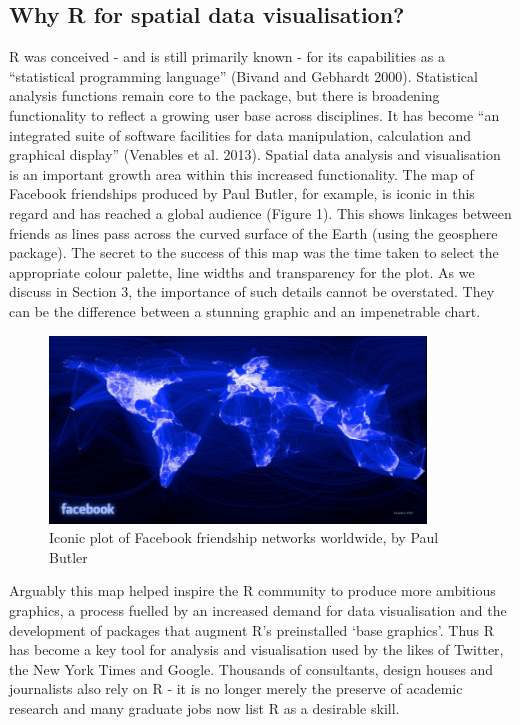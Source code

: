 \documentclass[]{article}
\let\Oldincludegraphics\includegraphics
\renewcommand{\includegraphics}[1]{\Oldincludegraphics[width=10cm]{#1}}
\begin{document}
\subsection{Why R for spatial data visualisation?}

R was conceived - and is still primarily known - for its capabilities as
a ``statistical programming language'' (Bivand and Gebhardt 2000).
Statistical analysis functions remain core to the package, but there is
broadening functionality to reflect a growing user base across
disciplines. It has become ``an integrated suite of software facilities
for data manipulation, calculation and graphical display'' (Venables et
al. 2013). Spatial data analysis and visualisation is an important
growth area within this increased functionality. The map of Facebook
friendships produced by Paul Butler, for example, is iconic in this
regard and has reached a global audience (Figure 1). This shows linkages
between friends as lines pass across the curved surface of the Earth (using
the geosphere package). The secret to the success of this map
was the time taken to select the appropriate colour palette, line widths
and transparency for the plot. As we discuss in Section 3, the importance
of such details cannot be overstated. They can be the difference between
a stunning graphic and an impenetrable chart.

\begin{figure}[htbp]
\centering
\includegraphics{figure/butler_facebook_2.jpg}
\caption{Iconic plot of Facebook friendship networks worldwide, by Paul
Butler}
\end{figure}

Arguably this map helped inspire the R community to produce more ambitious
graphics, a process fuelled by an increased demand for data visualisation
and the development of packages that augment R's preinstalled `base
graphics'. Thus R has become a key tool for analysis and visualisation
used by the likes of Twitter, the New York Times and Google. Thousands
of consultants, design houses and journalists also rely on R - it is no
longer merely the preserve of academic research and many graduate jobs
now list R as a desirable skill.
\end{document}
